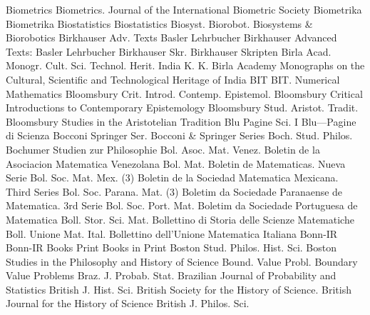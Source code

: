 {Biometrics}
{Biometrics. Journal of the International Biometric Society}
{Biometrika}
{Biometrika}
{Biostatistics}
{Biostatistics}
{Biosyst. Biorobot.}
{Biosystems & Biorobotics}
{Birkhauser Adv. Texts Basler Lehrbucher}
{Birkhauser Advanced Texts: Basler Lehrbucher}
{Birkhauser Skr.}
{Birkhauser Skripten}
{Birla Acad. Monogr. Cult. Sci. Technol. Herit. India}
{K. K. Birla Academy Monographs on the Cultural, Scientific and Technological Heritage of India}
{BIT}
{BIT. Numerical Mathematics}
{Bloomsbury Crit. Introd. Contemp. Epistemol.}
{Bloomsbury Critical Introductions to Contemporary Epistemology}
{Bloomsbury Stud. Aristot. Tradit.}
{Bloomsbury Studies in the Aristotelian Tradition}
{Blu Pagine Sci.}
{I Blu---Pagine di Scienza}
{Bocconi Springer Ser.}
{Bocconi & Springer Series}
{Boch. Stud. Philos.}
{Bochumer Studien zur Philosophie}
{Bol. Asoc. Mat. Venez.}
{Boletin de la Asociacion Matematica Venezolana}
{Bol. Mat.}
{Boletin de Matematicas. Nueva Serie}
{Bol. Soc. Mat. Mex. (3)}
{Boletin de la Sociedad Matematica Mexicana. Third Series}
{Bol. Soc. Parana. Mat. (3)}
{Boletim da Sociedade Paranaense de Matematica. 3rd Serie}
{Bol. Soc. Port. Mat.}
{Boletim da Sociedade Portuguesa de Matematica}
{Boll. Stor. Sci. Mat.}
{Bollettino di Storia delle Scienze Matematiche}
{Boll. Unione Mat. Ital.}
{Bollettino dell'Unione Matematica Italiana}
{Bonn-IR}
{Bonn-IR}
{Books Print}
{Books in Print}
{Boston Stud. Philos. Hist. Sci.}
{Boston Studies in the Philosophy and History of Science}
{Bound. Value Probl.}
{Boundary Value Problems}
{Braz. J. Probab. Stat.}
{Brazilian Journal of Probability and Statistics}
{British J. Hist. Sci.}
{British Society for the History of Science. British Journal for the History of Science}
{British J. Philos. Sci.}
